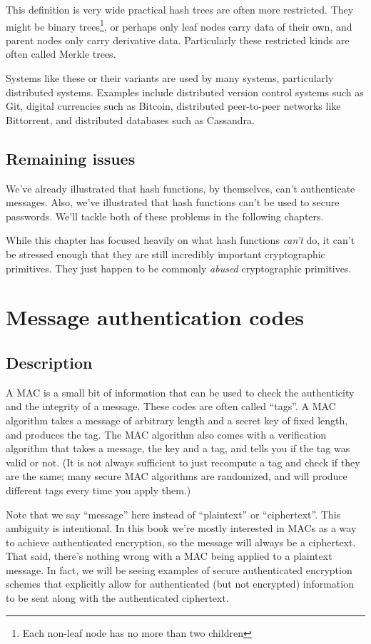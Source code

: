 \documentclass[11pt,ebook,table,dvipsnames]{memoir}
\begin{document}
This definition is very wide practical hash trees are often more
restricted. They might be binary trees\footnote{Each non-leaf node has no
more than two children}, or perhaps only leaf nodes carry data of
their own, and parent nodes only carry derivative data. Particularly
these restricted kinds are often called Merkle trees.

Systems like these or their variants are used by many systems,
particularly distributed systems. Examples include distributed version
control systems such as Git, digital currencies such as Bitcoin,
distributed peer-to-peer networks like Bittorrent, and distributed
databases such as Cassandra.
\section{Remaining issues}
\label{sec-2-6-10}

We've already illustrated that hash functions, by themselves, can't
authenticate messages. Also, we've illustrated that hash functions
can't be used to secure passwords. We'll tackle both of these
problems in the following chapters.

While this chapter has focused heavily on what hash functions \emph{can't}
do, it can't be stressed enough that they are still incredibly
important cryptographic primitives. They just happen to be commonly
\emph{abused} cryptographic primitives.
\chapter{Message authentication codes}
\label{sec-2-7}
\section{Description}
\label{sec-2-7-1}

A \Gls{MAC} is a small bit of information that can be used to check
the authenticity and the integrity of a message. These codes are often
called \enquote{tags}. A MAC algorithm takes a message of arbitrary length and
a secret key of fixed length, and produces the tag. The MAC algorithm
also comes with a verification algorithm that takes a message, the key
and a tag, and tells you if the tag was valid or not. (It is not
always sufficient to just recompute a tag and check if they are the
same; many secure MAC algorithms are randomized, and will produce
different tags every time you apply them.)

Note that we say \enquote{message} here instead of \enquote{plaintext} or
\enquote{ciphertext}. This ambiguity is intentional. In this book we're mostly
interested in MACs as a way to achieve authenticated encryption, so
the message will always be a ciphertext. That said, there's nothing
wrong with a MAC being applied to a plaintext message. In fact, we
will be seeing examples of secure authenticated encryption schemes
that explicitly allow for authenticated (but not encrypted)
information to be sent along with the authenticated ciphertext.
\end{document}
